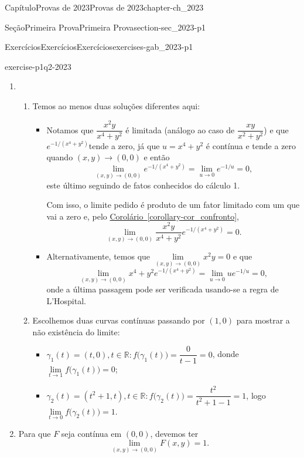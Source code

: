\documentclass[oneside,10pt,]{book}
\newcommand{\xreffont}{\relax}
\numberwithin{equation}{section}
\newcommand{\R}{\mathbb R}
\begin{document}
\begin{chapterptx}{Capítulo}{Provas de 2023}{}{Provas de 2023}{}{}{chapter-ch_2023}
\begin{sectionptx}{Seção}{Primeira Prova}{}{Primeira Prova}{}{}{section-sec_2023-p1}
\begin{exercises-subsection-numberless}{Exercícios}{Exercícios}{}{Exercícios}{}{}{exercises-gab_2023-p1}
\begin{divisionexercise}{2}{}{}{exercise-p1q2-2023}
\begin{enumerate}[label=\alph*]
\item{}%
\begin{enumerate}[label=\roman*]
\item{}Temos ao menos duas soluções diferentes aqui:%
\begin{itemize}[label=\textbullet]
\item{}Notamos que \(\dfrac{x^2y}{x^4+y^2}\) é limitada (análogo ao caso de \(\dfrac{xy}{x^2+y^2}\)) e que \(e^{-1/(x^4+y^2)}\)tende a zero, já que \(u=x^4+y^2\) é contínua e tende a zero quando \((x,y)\to (0,0)\) e então%
\begin{equation*}
\lim\limits_{(x,y)\to
(0,0)}e^{-1/(x^4+y^2)}=\lim\limits_{u\to
0}e^{-1/u}=0,
\end{equation*}
este último seguindo de fatos conhecidos do cálculo 1.%
\par
Com isso, o limite pedido é produto de um fator limitado com um que vai a zero e, pelo \hyperref[corollary-cor_confronto]{Corolário~{\xreffont\ref{corollary-cor_confronto}}},%
\begin{equation*}
\lim\limits_{(x,y)\to
(0,0)}\dfrac{x^2y}{x^4+y^2}e^{-1/(x^4+y^2)}=0.
\end{equation*}
%
\item{}Alternativamente, temos que \(\lim\limits_{(x,y)\to (0,0)}x^2y=0\) e que%
\begin{equation*}
\lim\limits_{(x,y)\to
(0,0)}{x^4+y^2}e^{-1/(x^4+y^2)}=\lim\limits_{u\to
0}ue^{-1/u}=0,
\end{equation*}
onde a última passagem pode ser verificada usando-se a regra de L'Hospital.%
\end{itemize}
%
\item{}Escolhemos duas curvas contínuas passando por \((1,0)\) para mostrar a não existência do limite:%
\begin{itemize}[label=\textbullet]
\item{}\(\gamma_1(t)=(t,0), t\in\R:
f\big(\gamma_1(t))=\dfrac{0}{t-1}=0\), donde \(\boxed{\lim\limits_{t\to
1} f\big(\gamma_1(t)\big)=0}\);%
\item{}\(\gamma_2(t)=(t^2+1,t), t\in\R:
f\big(\gamma_2(t))=\dfrac{t^2}{t^2+1-1}=1\), logo \(\boxed{\lim\limits_{t\to
0} f\big(\gamma_2(t)\big)=1}\).%
\end{itemize}
%
\end{enumerate}
%
\item{}Para que \(F\) seja contínua em \((0,0)\), devemos ter%
\begin{equation*}
\lim\limits_{(x,y)\to
(0,0)}F(x,y)=1.
\end{equation*}

\end{enumerate}
\end{divisionexercise}
\end{exercises-subsection-numberless}
\end{sectionptx}
\end{chapterptx}
\end{document}
